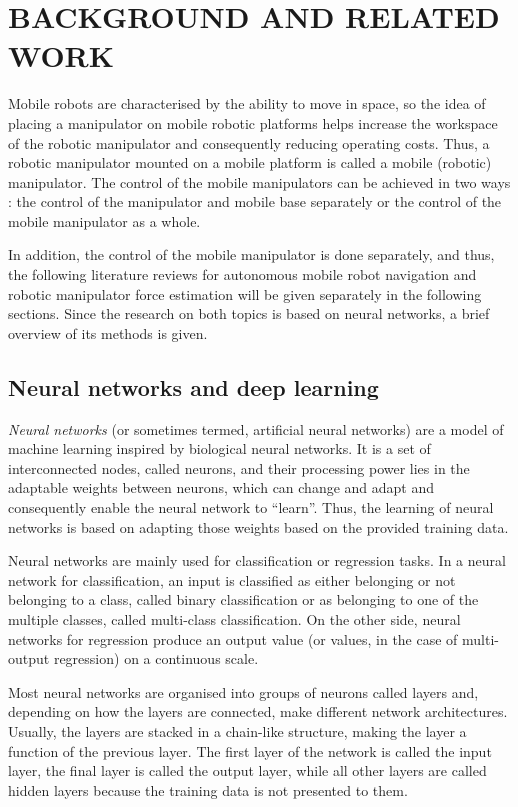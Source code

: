 \chapter{BACKGROUND AND RELATED WORK}
\label{chap:Literature}
    
Mobile robots are characterised by the ability to move in space, so the idea of placing a manipulator on mobile robotic platforms helps increase the workspace of the robotic manipulator and consequently reducing operating costs. Thus, a robotic manipulator mounted on a mobile platform is called a mobile (robotic) manipulator. The control of the mobile manipulators can be achieved in two ways \cite{Nassal1994}: the control of the manipulator and mobile base separately or the control of the mobile manipulator as a whole.

In addition, the control of the mobile manipulator is done separately, and thus, the following literature reviews for autonomous mobile robot navigation and robotic manipulator force estimation will be given separately in the following sections. Since the research on both topics is based on neural networks, a brief overview of its methods is given.

\section{Neural networks and deep learning}

\emph{Neural networks} (or sometimes termed, artificial neural networks) are a model of machine learning inspired by biological neural networks. It is a set of interconnected nodes, called neurons, and their processing power lies in the adaptable weights between neurons, which can change and adapt and consequently enable the neural network to ``learn''. Thus, the learning of neural networks is based on adapting those weights based on the provided training data.

Neural networks are mainly used for classification or regression tasks. In a neural network for classification, an input is classified as either belonging or not belonging to a class, called binary classification or as belonging to one of the multiple classes, called multi-class classification. On the other side, neural networks for regression produce an output value (or values, in the case of multi-output regression) on a continuous scale.

Most neural networks are organised into groups of neurons called layers and, depending on how the layers are connected, make different network architectures. Usually, the layers are stacked in a chain-like structure, making the layer a function of the previous layer. The first layer of the network is called the input layer, the final layer is called the output layer, while all other layers are called hidden layers because the training data is not presented to them.

